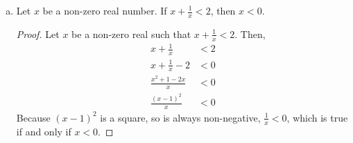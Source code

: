 \begin{enumerate}[(a)]
\begin{proof}
          Then, $x = \frac{p}{q}$ for integers $p$ and $q$.
          Also, $x+y = \frac{n}{m}$ for integers $n$ and $m$.
          Substituting, $\frac{p}{q} + y = \frac{n}{m}$.
          Rearranging,
          \begin{equation*}
            \frac{p}{q} + y = \frac{n}{m}        \iff
            p+yq            = \frac{qn}{m}       \iff
            y               = \frac{qn - mp}{qm}
          \end{equation*}
          but if $y$ equals the ratio of two integers ($qn-mp$ and $qm$), by definition, $y$ is rational.

          Therefore, by contradiction, the sum of a rational number and an irrational number is irrational.
        \end{proof}

  \item Let $x$ be a non-zero real number. If $x + \frac{1}{x} < 2$, then $x < 0$.
        \begin{proof}
          Let $x$ be a non-zero real such that $x + \frac{1}{x} < 2$. Then,
          \begin{align*}
            x + \frac{1}{x}        & < 2 \\
            x + \frac{1}{x} - 2    & < 0 \\
            \frac{x^2 + 1 - 2x}{x} & < 0 \\
            \frac{(x-1)^2}{x}      & < 0
          \end{align*}
          Because $(x-1)^2$ is a square, so is always non-negative, $\frac{1}{x} < 0$, which is true if and only if $x < 0$.
        \end{proof}
\end{enumerate}


